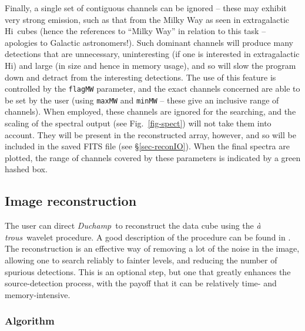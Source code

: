 \documentclass[12pt,a4paper]{article}
\newcommand{\hi}{H{\sc i}}
\newcommand{\duchamp}{\emph{Duchamp}}
\newcommand{\atrous}{\textit{{\`a} trous}}
\begin{document}
Finally, a single set of contiguous channels can be ignored -- these
may exhibit very strong emission, such as that from the Milky Way as
seen in extragalactic \hi\ cubes (hence the references to ``Milky
Way'' in relation to this task -- apologies to Galactic
astronomers!). Such dominant channels will produce many detections
that are unnecessary, uninteresting (if one is interested in
extragalactic \hi) and large (in size and hence in memory usage), and
so will slow the program down and detract from the interesting
detections. The use of this feature is controlled by the
\texttt{flagMW} parameter, and the exact channels concerned are able
to be set by the user (using \texttt{maxMW} and \texttt{minMW} --
these give an inclusive range of channels). When employed, these
channels are ignored for the searching, and the scaling of the
spectral output (see Fig.~\ref{fig-spect}) will not take them into
account. They will be present in the reconstructed array, however, and
so will be included in the saved FITS file (see
\S\ref{sec-reconIO}). When the final spectra are plotted, the range of
channels covered by these parameters is indicated by a green hashed
box.

\subsection{Image reconstruction}
\label{sec-recon}

The user can direct \duchamp\ to reconstruct the data cube using the
\atrous\ wavelet procedure. A good description of the procedure can be
found in \citet{starck02:book}. The reconstruction is an effective way
of removing a lot of the noise in the image, allowing one to search
reliably to fainter levels, and reducing the number of spurious
detections. This is an optional step, but one that greatly enhances
the source-detection process, with the payoff that it can be
relatively time- and memory-intensive.

\subsubsection{Algorithm}
\end{document}
